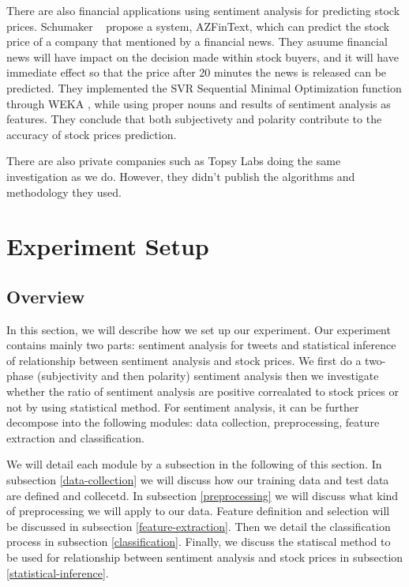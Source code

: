 \documentclass[12pt]{article}
\begin{document}
There are also financial applications using sentiment analysis for predicting stock prices. Schumaker \etal~\cite{Schumaker:2009} propose a system, AZFinText, which can predict the stock price of a company that mentioned by a financial news. They asuume financial news will have impact on the decision made within stock buyers, and it will have immediate effect so that the price after 20 minutes the news is released can be predicted. They implemented the SVR Sequential Minimal Optimization function through WEKA \cite{Witten:2005}, while using proper nouns and results of sentiment analysis as features. They conclude that both subjectivety and polarity contribute to the accuracy of stock prices prediction.

There are also private companies such as Topsy Labs \cite{Topsy} doing the same investigation as we do. However, they didn't publish the algorithms and methodology they used.

\section{Experiment Setup}
\subsection{Overview}
In this section, we will describe how we set up our experiment. Our experiment contains mainly two parts: sentiment analysis for tweets and statistical inference of relationship between sentiment analysis and stock prices. We first do a two-phase (subjectivity and then polarity) sentiment analysis then we investigate whether the ratio of sentiment analysis are positive correalated to stock prices or not by using statistical method. For sentiment analysis, it can be further decompose into the following modules: data collection, preprocessing, feature extraction and classification. 

We will detail each module by a subsection in the following of this section. In subsection \ref{data-collection} we will discuss how our training data and test data are defined and collecetd. In subsection \ref{preprocessing} we will discuss what kind of preprocessing we will apply to our data. Feature definition and selection will be discussed in subsection \ref{feature-extraction}. Then we detail the classification process in subsection \ref{classification}. Finally, we discuss the statiscal method to be used for relationship between sentiment analysis and stock prices in subsection \ref{statistical-inference}.
\end{document}
